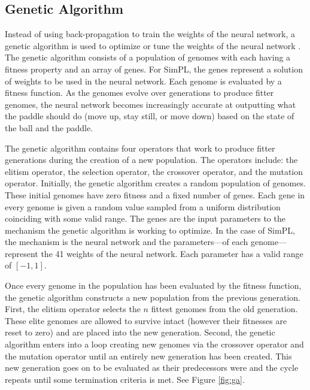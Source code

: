 \pagebreak

\subsection{Genetic Algorithm}


Instead of using back-propagation to train the weights of the neural network, a genetic algorithm is used to optimize or tune the weights of the neural network \cite{neuralnetworks}. The genetic algorithm consists of a population of genomes with each having a fitness property and an array of genes. For SimPL, the genes represent a solution of weights to be used in the neural network. Each genome is evaluated by a fitness function. As the genomes evolve over generations to produce fitter genomes, the neural network becomes increasingly accurate at outputting what the paddle should do (move up, stay still, or move down) based on the state of the ball and the paddle. 

The genetic algorithm contains four operators that work to produce fitter generations during the creation of a new population. The operators include: the elitism operator, the selection operator, the crossover operator, and the mutation operator. Initially, the genetic algorithm creates a random population of genomes. These initial genomes have zero fitness and a fixed number of genes. Each gene in every genome is given a random value sampled from a uniform distribution coinciding with some valid range. The genes are the input parameters to the mechanism the genetic algorithm is working to optimize. In the case of SimPL, the mechanism is the neural network and the parameters---of each genome---represent the 41 weights of the neural network. Each parameter has a valid range of $[-1,1]$. 

Once every genome in the population has been evaluated by the fitness function, the genetic algorithm constructs a new population from the previous generation. First, the elitism operator selects the $n$ fittest genomes from the old generation. These elite genomes are allowed to survive intact (however their fitnesses are reset to zero) and are placed into the new generation. Second, the genetic algorithm enters into a loop creating new genomes via the crossover operator and the mutation operator until an entirely new generation has been created. This new generation goes on to be evaluated as their predecessors were and the cycle repeats until some termination criteria is met. See Figure \ref{fig:ga}.


